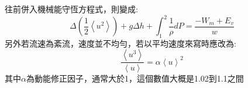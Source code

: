 \documentclass[../main.tex]{subfiles}
\begin{document}
\begin{itemize}
\begin{itemize}
      往前併入機械能守恆方程式，則變成:
      \begin{equation}
        \boxed{\Delta \left(\frac{1}{2}\left<u^2\right>\right)  + g\Delta h + \int_1^2 \frac{1}{\rho} dP =
        \frac{-W_m + E_v}{w}}
      \end{equation}
      另外若流速為紊流，速度並不均勻，若以平均速度來寫時應改為:
      \begin{equation}
        \frac{\left<u^3\right>}{\left<u\right>} = \alpha \left<u\right>^2
      \end{equation}
      其中$\alpha$為動能修正因子，通常大於1，這個數值大概是1.02到1.1之間
  \end{itemize}
\end{itemize}
\end{document}
